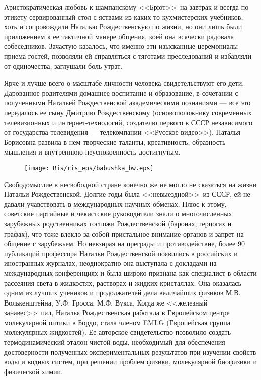 Аристократическая любовь к шампанскому <<Брют>>\ на завтрак и всегда по этикету сервированный стол с яствами из каких-то кухмистерских учебников, хоть и сопровождали Наталью Рождественскую по жизни, но они лишь были приложением к ее тактичной манере общения, коей она всячески радовала собеседников. Зачастую казалось, что именно эти изысканные церемониалы приема гостей, позволяли ей справляться с тяготами преследований и избавляли от одиночества, заглушали боль утрат.

\thispagestyle{myheadings}

Ярче и лучше всего о масштабе личности человека свидетельствуют его дети. Дарованное родителями домашнее воспитание и образование, в сочетании с полученными Натальей Рождественской академическими познаниями --- все это передалось ее сыну Дмитрию Рождественскому (основоположнику современных телевизионных и интернет-технологий, создателю первого в СССР независимого от государства телевидения --- телекомпании <<Русское видео>>). Наталья Борисовна развила в нем творческие таланты, креативность, образность мышления и внутреннюю неуспокоенность достигнутым.

\begin{figure}[tbp]
\centerline{\hbox{\texttt{[image: Ris/ris\_eps/babushka\_bw.eps]}}}
\end{figure}

Свободомыслие в несвободной стране конечно же не могло не сказаться на жизни Натальи Рождественской. Долгие годы была <<невыездной>>\ из СССР, ей не давали учавствовать в  международных научных обменах. Плюс к этому, советские партийные и чекистские руководители знали о многочисленных зарубежных родственниках госпожи Рождественской (баронах, герцогах и графах), что тоже влекло за собой пристальное внимание органов и запрет на общение с зарубежьем. Но невзирая на преграды и противодействие, более 90 публикаций профессора Натальи Рождественской появились в российских и иностранных журналах, неоднократно она выступала с докладами на международных конференциях и была широко признана как специалист в области рассеяния света в жидкостях, растворах и жидких кристаллах. Она оказалась одним из лучших учеников и продолжателей дела величайших физиков М.В. Волькенштейна, У.Ф. Гросса, М.Ф. Вукса, Когда же <<железный занавес>>\ пал, Наталья Рождественская работала в Европейском центре молекулярной оптики в Бордо, стала членом EMLG (Европейская группа молекулярных жидкостей). Ее авторское свидетельство позволило создать термодинамический эталон чистой воды, необходимый для обеспечения достоверности полученных экспериментальных результатов при изучении свойств воды и водных систем, при решении проблем физики, молекулярной биофизики и физической химии.

